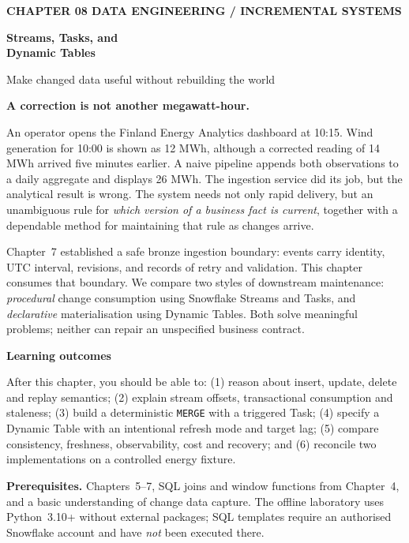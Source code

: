 \documentclass[11pt,twoside]{article}
\begin{document}
{\sffamily\bfseries\fontsize{9}{11}\selectfont\color{steelblue} CHAPTER 08 \hfill DATA ENGINEERING / INCREMENTAL SYSTEMS}\par\vspace{3mm}
{\sffamily\bfseries\fontsize{21.2}{24.5}\selectfont\color{navy} Streams, Tasks, and\\Dynamic Tables}\par\vspace{2mm}
{\sffamily\fontsize{11.1}{14}\selectfont\color{steelblue} Make changed data useful without rebuilding the world}\par\vspace{4mm}
\begin{insight}\textbf{A correction is not another megawatt-hour.}\par
An operator opens the Finland Energy Analytics dashboard at 10:15. Wind generation for 10:00 is shown as 12 MWh, although a corrected reading of 14 MWh arrived five minutes earlier. A naive pipeline appends both observations to a daily aggregate and displays 26 MWh. The ingestion service did its job, but the analytical result is wrong. The system needs not only rapid delivery, but an unambiguous rule for \emph{which version of a business fact is current}, together with a dependable method for maintaining that rule as changes arrive.\end{insight}
Chapter~7 established a safe bronze ingestion boundary: events carry identity, UTC interval, revisions, and records of retry and validation. This chapter consumes that boundary. We compare two styles of downstream maintenance: \emph{procedural} change consumption using Snowflake Streams and Tasks, and \emph{declarative} materialisation using Dynamic Tables. Both solve meaningful problems; neither can repair an unspecified business contract.
\begin{whitebox}\textbf{Learning outcomes}\par
After this chapter, you should be able to: (1) reason about insert, update, delete and replay semantics; (2) explain stream offsets, transactional consumption and staleness; (3) build a deterministic \texttt{MERGE} with a triggered Task; (4) specify a Dynamic Table with an intentional refresh mode and target lag; (5) compare consistency, freshness, observability, cost and recovery; and (6) reconcile two implementations on a controlled energy fixture.\end{whitebox}
\textbf{Prerequisites.} Chapters~5--7, SQL joins and window functions from Chapter~4, and a basic understanding of change data capture. The offline laboratory uses Python~3.10+ without external packages; SQL templates require an authorised Snowflake account and have \emph{not} been executed there.
\end{document}
